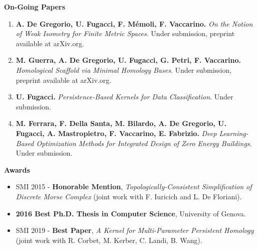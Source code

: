 \documentclass[11pt]{article}
\begin{document}
\noindent
{\bf On-Going Papers}
\begin{enumerate}

\item {\bf A. De Gregorio, U. Fugacci, F. M\'emoli, F. Vaccarino.} {\em On the Notion of Weak Isometry for Finite Metric Spaces}. Under submission, preprint available at arXiv.org.

\item {\bf M. Guerra, A. De Gregorio, U. Fugacci, G. Petri, F. Vaccarino.} {\em Homological Scaffold via Minimal Homology Bases}. Under submission, preprint available at arXiv.org.

\item {\bf U. Fugacci.} {\em Persistence-Based Kernels for Data Classification}. Under submission.

\item {\bf M. Ferrara, F. Della Santa, M. Bilardo, A. De Gregorio, U. Fugacci, A. Mastropietro, F. Vaccarino, E. Fabrizio.} {\em Deep Learning-Based Optimization Methods for Integrated Design of Zero Energy Buildings}. Under submission.


%
%
%
%

\end{enumerate}


\vspace*{2.5ex}
\noindent
{\Large\bf Awards}
\begin{itemize}
\item SMI 2015 - {\bf Honorable Mention}, {\em Topologically-Consistent Simplification of Discrete Morse Complex} (joint work with F. Iuricich and L. De Floriani).
\item {\bf 2016 Best Ph.D. Thesis in Computer Science}, University of Genova.
\item SMI 2019 - {\bf Best Paper}, {\em A Kernel for Multi-Parameter Persistent Homology} (joint work with R. Corbet, M. Kerber, C. Landi, B. Wang).
\end{itemize}
\end{document}
